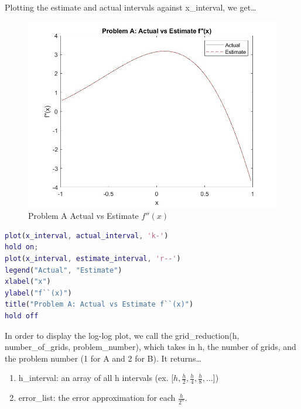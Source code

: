 \documentclass[10pt,letterpaper]{article}
\begin{document}
\begin{enumerate}[a)]
    Plotting the estimate and actual intervals against x\_interval, we get\ldots
    \begin{figure}[h!]
      \centering
      \includegraphics[width=0.75\linewidth]{problem_a_estimate_vs_actual.jpg}
      \caption{Problem A\: Actual vs Estimate $f''(x)$}\label{fig:problem_a_estimate_vs_actual}
    \end{figure}

     \begin{lstlisting}[language = Matlab]
% Plotting Problem A: Actual vs Estimate f''(x)
plot(x_interval, actual_interval, 'k-')
hold on;
plot(x_interval, estimate_interval, 'r--')
legend("Actual", "Estimate")
xlabel("x")
ylabel("f``(x)")
title("Problem A: Actual vs Estimate f``(x)")
hold off
\end{lstlisting}
    
    In order to display the log-log plot, we call the grid\_reduction(h, number\_of\_grids, problem\_number), which takes in h, the number of grids, and the problem number (1 for A and 2 for B). It returns\ldots 
    \begin{enumerate}
      \item h\_interval: an array of all h intervals (ex. [$h, \frac{h}{2}, \frac{h}{4}, \frac{h}{8},\ldots$])
      \item error\_list: the error approximation for each $\frac{h}{2^n}$. 
    \end{enumerate}


\end{enumerate}
\end{document}
